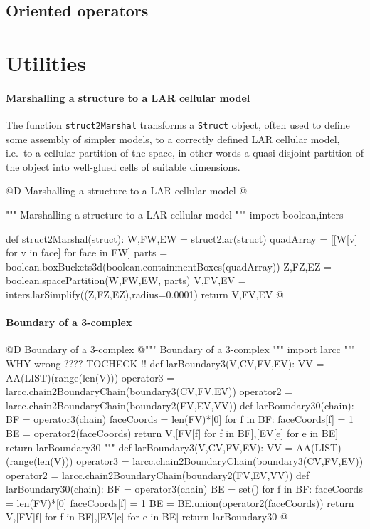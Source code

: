 \documentclass[11pt,oneside]{article}	%
\begin{document}
\subsection{Oriented operators}

\appendix
\section{Utilities}


\paragraph{Marshalling a structure to a LAR cellular model}
The function \texttt{struct2Marshal} transforms a \texttt{Struct} object, often used to 
define some assembly of simpler models, to a correctly defined LAR cellular model, i.e.~to
a cellular partition of the space, in other words a quasi-disjoint partition of the object into well-glued cells of suitable dimensions.

@D Marshalling a structure to a LAR cellular model
@{""" Marshalling a structure to a LAR cellular model """
import boolean,inters

def struct2Marshal(struct):
    W,FW,EW = struct2lar(struct)
    quadArray = [[W[v] for v in face] for face in FW]
    parts = boolean.boxBuckets3d(boolean.containmentBoxes(quadArray))
    Z,FZ,EZ = boolean.spacePartition(W,FW,EW, parts)
    V,FV,EV = inters.larSimplify((Z,FZ,EZ),radius=0.0001)
    return V,FV,EV
@}

\paragraph{Boundary of a 3-complex}
@D Boundary of a 3-complex
@{""" Boundary of a 3-complex """
import larcc
"""  WHY wrong ????  TOCHECK !!
def larBoundary3(V,CV,FV,EV):
    VV = AA(LIST)(range(len(V)))
    operator3 = larcc.chain2BoundaryChain(boundary3(CV,FV,EV))
    operator2 = larcc.chain2BoundaryChain(boundary2(FV,EV,VV))
    def larBoundary30(chain):
        BF = operator3(chain)
        faceCoords = len(FV)*[0]
        for f in BF: faceCoords[f] = 1
        BE = operator2(faceCoords)
        return V,[FV[f] for f in BF],[EV[e] for e in BE]
    return larBoundary30
"""
def larBoundary3(V,CV,FV,EV):
    VV = AA(LIST)(range(len(V)))
    operator3 = larcc.chain2BoundaryChain(boundary3(CV,FV,EV))
    operator2 = larcc.chain2BoundaryChain(boundary2(FV,EV,VV))
    def larBoundary30(chain):
        BF = operator3(chain)
        BE = set()
        for f in BF: 
            faceCoords = len(FV)*[0]
            faceCoords[f] = 1
            BE = BE.union(operator2(faceCoords))
        return V,[FV[f] for f in BF],[EV[e] for e in BE]
    return larBoundary30
@}





\end{document}
